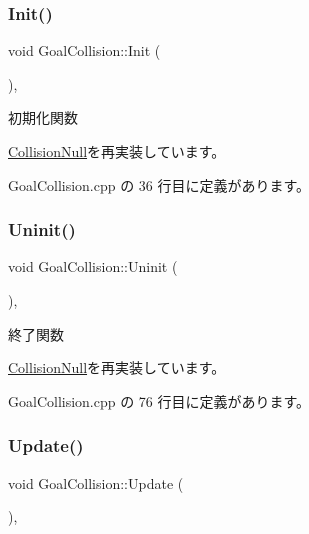 \subsubsection{\texorpdfstring{Init()}{Init()}}
{\footnotesize\ttfamily void Goal\+Collision\+::\+Init (\begin{DoxyParamCaption}{ }\end{DoxyParamCaption})\hspace{0.3cm}{\ttfamily [override]}, {\ttfamily [virtual]}}



初期化関数 



\mbox{\hyperlink{class_collision_null_a18cfc21fefcd3e8dec380ac44a85f111}{Collision\+Null}}を再実装しています。



 Goal\+Collision.\+cpp の 36 行目に定義があります。

\mbox{\label{class_goal_collision_ab818bad44ffcd595f1c495e659c0b348}} 
\subsubsection{\texorpdfstring{Uninit()}{Uninit()}}
{\footnotesize\ttfamily void Goal\+Collision\+::\+Uninit (\begin{DoxyParamCaption}{ }\end{DoxyParamCaption})\hspace{0.3cm}{\ttfamily [override]}, {\ttfamily [virtual]}}



終了関数 



\mbox{\hyperlink{class_collision_null_aafac3fdab43845465fd1e0198c423ccf}{Collision\+Null}}を再実装しています。



 Goal\+Collision.\+cpp の 76 行目に定義があります。

\mbox{\label{class_goal_collision_a1e3995dc2f5ba2678580d06699ca6936}} 
\subsubsection{\texorpdfstring{Update()}{Update()}}
{\footnotesize\ttfamily void Goal\+Collision\+::\+Update (\begin{DoxyParamCaption}{ }\end{DoxyParamCaption})\hspace{0.3cm}{\ttfamily [override]}, {\ttfamily [virtual]}}



